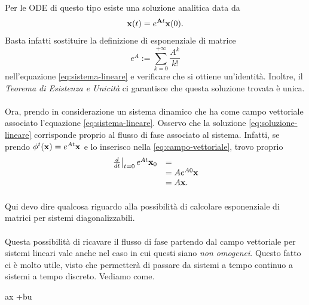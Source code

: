 Per le ODE di questo tipo esiste una soluzione analitica data da
\begin{equation}
    \mathbf{x}(t) = e^{\mathbf{A} t} \mathbf{x}(0).
    \label{eq:soluzione-lineare}
\end{equation}
Basta infatti sostituire la definizione di esponenziale di matrice
\begin{equation}
    e^{A} := \sum_{k=0}^{+\infty} \frac{A^k}{k!}
    \label{eq:exp-matrice}
\end{equation}
nell'equazione \eqref{eq:sistema-lineare} e verificare che si ottiene un'identità.
Inoltre, il \emph{Teorema di Esistenza e Unicità} ci garantisce che questa soluzione
trovata è unica.

\paragraph{}
Ora, prendo in considerazione un sistema dinamico che ha come campo vettoriale associato
l'equazione \eqref{eq:sistema-lineare}. Osservo che la soluzione \eqref{eq:soluzione-lineare}
corrisponde proprio al flusso di fase associato al sistema. Infatti, se prendo
$\phi^t(\mathbf{x}) = e^{At} \mathbf{x}$ e lo inserisco nella \eqref{eq:campo-vettoriale},
trovo proprio
\begin{equation*}
    \begin{array}{ll}
        \left. \frac d{dt} \right|_{t=0} e^{At} \mathbf{x}_0 &= \\
        &= A e^{A0} \mathbf{x}  \\
        &= A \mathbf{x}.
    \end{array}
\end{equation*}

\paragraph{}
 Qui devo dire qualcosa riguardo alla possibilità di calcolare
esponenziale di matrici per sistemi diagonalizzabili.


\paragraph{}
Questa possibilità di ricavare il flusso di fase partendo dal campo vettoriale per
sistemi lineari vale anche nel caso in cui questi siano \emph{non omogenei}.
Questo fatto ci è molto utile, visto che permetterà di passare da sistemi a tempo
continuo a sistemi a tempo discreto. Vediamo come.

\begin{definition}
    ax +bu
    \label{def:sistema-lineare}
\end{definition}

